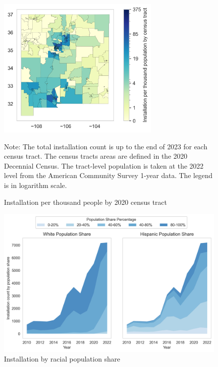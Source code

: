 \documentclass[12pt,twoside,letterpaper]{article}
\begin{document}
\begin{figure}[H]
    \centering
\includegraphics[width=0.7\textwidth]{figures/tract_count_per_kpop_map.png}
    \caption{Installation per thousand people by 2020 census tract}
    \label{fig:install_kpop}
      \begin{flushleft}
        \footnotesize Note: The total installation count is up to the end of 2023 for each census tract. The census tracts areas are defined in the 2020 Decennial Census. The tract-level population is taken at the 2022 level from the American Community Survey 1-year data. The legend is in logarithm scale. 
    \end{flushleft}
\end{figure}

\begin{figure}[H]
    \centering
\includegraphics[width=1\textwidth]{figures/population_quintiles.png}
    \caption{Installation by racial population share}
    \label{fig:population_quintiles}
\end{figure}
\end{document}
